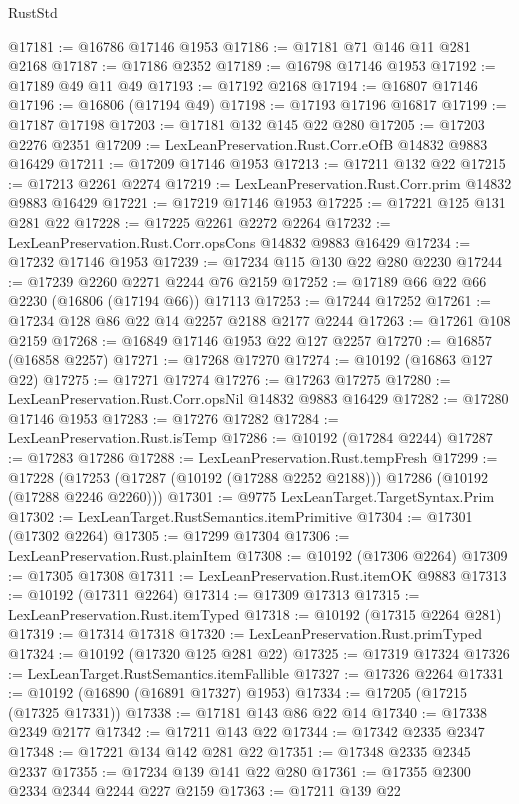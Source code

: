 \begin{lexlean}{RustStd}
\begin{coremodule}
@17181 := @16786 @17146 @1953
@17186 := @17181 @71 @146 @11 @281 @2168
@17187 := @17186 @2352
@17189 := @16798 @17146 @1953
@17192 := @17189 @49 @11 @49
@17193 := @17192 @2168
@17194 := @16807 @17146
@17196 := @16806 (@17194 @49)
@17198 := @17193 @17196 @16817
@17199 := @17187 @17198
@17203 := @17181 @132 @145 @22 @280
@17205 := @17203 @2276 @2351
@17209 := LexLeanPreservation.Rust.Corr.eOfB @14832 @9883 @16429
@17211 := @17209 @17146 @1953
@17213 := @17211 @132 @22
@17215 := @17213 @2261 @2274
@17219 := LexLeanPreservation.Rust.Corr.prim @14832 @9883 @16429
@17221 := @17219 @17146 @1953
@17225 := @17221 @125 @131 @281 @22
@17228 := @17225 @2261 @2272 @2264
@17232 := LexLeanPreservation.Rust.Corr.opsCons @14832 @9883 @16429
@17234 := @17232 @17146 @1953
@17239 := @17234 @115 @130 @22 @280 @2230
@17244 := @17239 @2260 @2271 @2244 @76 @2159
@17252 := @17189 @66 @22 @66 @2230 (@16806 (@17194 @66)) @17113
@17253 := @17244 @17252
@17261 := @17234 @128 @86 @22 @14 @2257 @2188 @2177 @2244
@17263 := @17261 @108 @2159
@17268 := @16849 @17146 @1953 @22 @127 @2257
@17270 := @16857 (@16858 @2257)
@17271 := @17268 @17270
@17274 := @10192 (@16863 @127 @22)
@17275 := @17271 @17274
@17276 := @17263 @17275
@17280 := LexLeanPreservation.Rust.Corr.opsNil @14832 @9883 @16429
@17282 := @17280 @17146 @1953
@17283 := @17276 @17282
@17284 := LexLeanPreservation.Rust.isTemp
@17286 := @10192 (@17284 @2244)
@17287 := @17283 @17286
@17288 := LexLeanPreservation.Rust.tempFresh
@17299 := @17228
    (@17253 (@17287 (@10192 (@17288 @2252 @2188))) @17286 (@10192 (@17288 @2246 @2260)))
@17301 := @9775 LexLeanTarget.TargetSyntax.Prim
@17302 := LexLeanTarget.RustSemantics.itemPrimitive
@17304 := @17301 (@17302 @2264)
@17305 := @17299 @17304
@17306 := LexLeanPreservation.Rust.plainItem
@17308 := @10192 (@17306 @2264)
@17309 := @17305 @17308
@17311 := LexLeanPreservation.Rust.itemOK @9883
@17313 := @10192 (@17311 @2264)
@17314 := @17309 @17313
@17315 := LexLeanPreservation.Rust.itemTyped
@17318 := @10192 (@17315 @2264 @281)
@17319 := @17314 @17318
@17320 := LexLeanPreservation.Rust.primTyped
@17324 := @10192 (@17320 @125 @281 @22)
@17325 := @17319 @17324
@17326 := LexLeanTarget.RustSemantics.itemFallible
@17327 := @17326 @2264
@17331 := @10192 (@16890 (@16891 @17327) @1953)
@17334 := @17205 (@17215 (@17325 @17331))
@17338 := @17181 @143 @86 @22 @14
@17340 := @17338 @2349 @2177
@17342 := @17211 @143 @22
@17344 := @17342 @2335 @2347
@17348 := @17221 @134 @142 @281 @22
@17351 := @17348 @2335 @2345 @2337
@17355 := @17234 @139 @141 @22 @280
@17361 := @17355 @2300 @2334 @2344 @2244 @227 @2159
@17363 := @17211 @139 @22

\end{coremodule}
\end{lexlean}
